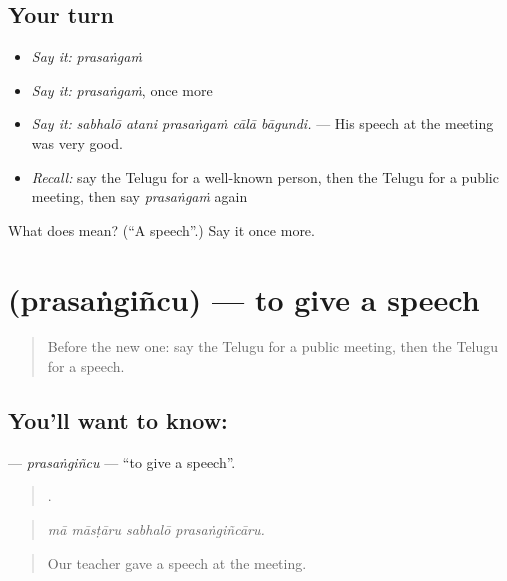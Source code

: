 \subsection*{Your turn}
\begin{itemize}
\raggedright
  \item \emph{Say it:} \emph{prasaṅgaṁ}
  \item \emph{Say it:} \emph{prasaṅgaṁ}, once more
  \item \emph{Say it:} \emph{sabhalō atani prasaṅgaṁ cālā bāgundi.} — His speech at the meeting was very good.
  \item \emph{Recall:} say the Telugu for a well-known person, then the Telugu for a public meeting, then say \emph{prasaṅgaṁ} again
\end{itemize}

\begin{tcolorbox}[breakable,colback=teal!4,colframe=teal!35!black,title={Before you move on}]
What does  mean? (\textquotedblleft{}A speech\textquotedblright{}.) Say it once more.
\end{tcolorbox}
\section[\texorpdfstring{\te{ప్రసంగించు} (prasaṅgiñcu)}{ప్రసంగించు (prasaṅgiñcu)}]{ (prasaṅgiñcu) — to give a speech}

\label{lesson:TE-C342-prasangincu}



\begin{quote}
Before the new one: say the Telugu for a public meeting, then the Telugu for a speech.
\end{quote}

\subsection*{You'll want to know: }
\textbf{} — \emph{prasaṅgiñcu} — \textquotedblleft{}to give a speech\textquotedblright{}.

\begin{quote}
   .
\end{quote}

\begin{quote}
\emph{mā māsṭāru sabhalō prasaṅgiñcāru.}
\end{quote}

\begin{quote}
Our teacher gave a speech at the meeting.
\end{quote}


